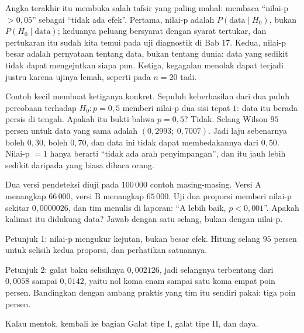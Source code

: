 Angka terakhir itu membuka salah tafsir yang paling mahal: membaca ``nilai-p
$>0{,}05$'' sebagai ``tidak ada efek''. Pertama, nilai-p adalah
$P(\text{data}\mid H_0)$, bukan $P(H_0\mid\text{data})$; keduanya peluang bersyarat
dengan syarat tertukar, dan pertukaran itu sudah kita temui pada uji diagnostik di
Bab 17. Kedua, nilai-p besar adalah pernyataan tentang data, bukan tentang dunia: data
yang sedikit tidak dapat mengejutkan siapa pun. Ketiga, kegagalan menolak dapat terjadi
justru karena ujinya lemah, seperti pada $n=20$ tadi.

Contoh kecil membuat ketiganya konkret. Sepuluh keberhasilan dari dua puluh percobaan
terhadap $H_0\colon p=0{,}5$ memberi nilai-p dua sisi tepat $1$: data itu berada
persis di tengah. Apakah itu bukti bahwa $p=0{,}5$? Tidak. Selang Wilson $95$ persen
untuk data yang sama adalah $(0{,}2993;\ 0{,}7007)$. Jadi laju sebenarnya boleh
$0{,}30$, boleh $0{,}70$, dan data ini tidak dapat membedakannya dari $0{,}50$.
Nilai-p $=1$ hanya berarti ``tidak ada arah penyimpangan'', dan itu jauh lebih sedikit
daripada yang biasa dibaca orang.

\begin{tantangan}
Dua versi pendeteksi diuji pada \mbox{$100\,000$} contoh masing-masing. Versi A menangkap
\mbox{$66\,000$}, versi B menangkap \mbox{$65\,000$}. Uji dua proporsi memberi nilai-p sekitar
$0{,}0000026$, dan tim menulis di laporan: ``A lebih baik, $p<0{,}001$''. Apakah
kalimat itu didukung data? Jawab dengan satu selang, bukan dengan nilai-p.

Petunjuk 1: nilai-p mengukur kejutan, bukan besar efek. Hitung selang $95$ persen untuk
selisih kedua proporsi, dan perhatikan satuannya.

Petunjuk 2: galat baku selisihnya $0{,}002126$, jadi selangnya terbentang dari
$0{,}0058$ sampai $0{,}0142$, yaitu nol koma enam sampai satu koma empat poin persen.
Bandingkan dengan ambang praktis yang tim itu sendiri pakai: tiga poin persen.

Kalau mentok, kembali ke bagian Galat tipe I, galat tipe II, dan daya.
\end{tantangan}

